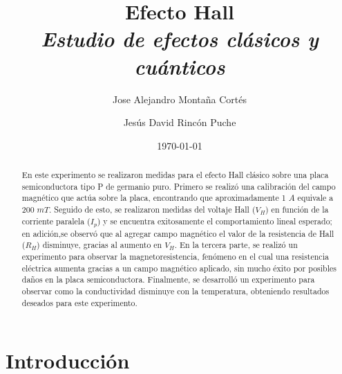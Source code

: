 \documentclass[%
 reprint,
 amsmath,amssymb,
 aps,
]{revtex4-1}
\newcommand{\subtitle}[1]{%
\posttitle{%
    \par\end{center}
\begin{center}\large#1\end{center}
\vskip0.5em}%
}
\begin{document}

\title{Efecto Hall\\ \textit{Estudio de efectos clásicos y cuánticos } }%


\author{Jose Alejandro Montaña Cortés}
\author{Jesús David Rincón Puche}%
%


\date{\today}%

\begin{abstract}

En este experimento se realizaron medidas para el efecto Hall clásico sobre una placa semiconductora tipo P de germanio puro. Primero se realizó una calibración del campo magnético que actúa sobre la placa, encontrando que aproximadamente 1 $A$ equivale a 200 $mT$. Seguido de esto, se realizaron medidas del voltaje Hall ($V_H$) en función de la corriente paralela ($I_p$) y se encuentra exitosamente el comportamiento lineal esperado; en adición,se observó que al agregar campo magnético el valor de la resistencia de Hall ($R_H$) disminuye, gracias al aumento en $V_H$. En la tercera parte, se realizó un experimento para observar la magnetoresistencia, fenómeno en el cual una resistencia eléctrica aumenta gracias a un campo magnético aplicado, sin mucho éxito por posibles daños en la placa semiconductora. Finalmente, se desarrolló un experimento para observar como la conductividad disminuye con la temperatura, obteniendo resultados deseados para este experimento.

\end{abstract}
\maketitle

\section{Introducción}
\end{document}
